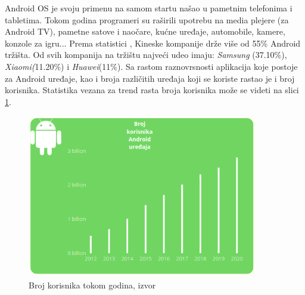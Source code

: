 \documentclass[android.tex]{subfiles}
\begin{document}
Android OS je svoju primenu na samom startu našao u pametnim telefonima i tabletima. Tokom godina programeri su raširili upotrebu na media plejere (za Android TV), pametne satove i naočare, kućne uređaje, automobile, kamere, konzole za igru...  \cite{sajt:androidDevelopers} Prema statistici \cite{sajt:statistika}, Kineske kompanije drže više od 55\% Android tržišta. Od svih kompanija na tržištu najveći udeo imaju:\textit{ Samsung} (37.10\%), \textit{Xiaomi(}11.20\%) i \textit{Huawei}(11\%). Sa rastom raznovrsnosti aplikacija koje postoje za Android uređaje, kao i broja različitih uređaja koji se koriste rastao je i broj korisnika. Statistika vezana za trend rasta broja korisnika može se videti na slici \ref{fig:brKorisnika}.

\begin{figure}[!ht]
  \centering
  \label{fig:brKorisnika}
  \includegraphics[width=0.9\textwidth]{brKorisnika.png}
  \caption{Broj korisnika tokom godina, izvor \cite{sajt:statistika}}
\end{figure}
\end{document}
